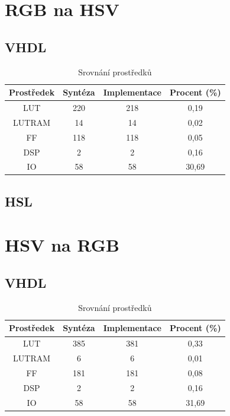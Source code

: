 \documentclass[FM,DP]{tulthesis}
\begin{document}
\section{RGB na HSV}
\subsection{VHDL}

\begin{table}[!h]
    \centering
    \begin{tabular}{cccc}\toprule
        Prostředek & Syntéza & Implementace & Procent (\%) \\\midrule
        LUT        & 220     & 218          & 0,19         \\
        LUTRAM     & 14      & 14
                   & 0,02                                  \\
        FF         & 118     & 118
                   & 0,05                                  \\
        DSP        & 2       & 2
                   & 0,16                                  \\
        IO         & 58      & 58           & 30,69        \\ \bottomrule
    \end{tabular}
    \caption{Srovnání prostředků}
    \label{tab:rgb2hsv}
\end{table}
\subsection{HSL}

\newpage
\section{HSV na RGB}

\subsection{VHDL}

\begin{table}[!h]
    \centering
    \begin{tabular}{cccc}
        Prostředek & Syntéza & Implementace & Procent (\%) \\\midrule
        LUT        & 385     & 381          & 0,33         \\
        LUTRAM     & 6       & 6            & 0,01         \\
        FF         & 181     & 181          & 0,08         \\
        DSP        & 2       & 2            & 0,16         \\
        IO         & 58      & 58           & 31,69        \\ \bottomrule
    \end{tabular}
    \caption{Srovnání prostředků}
    \label{tab:hsv2rgb}
\end{table}
\end{document}
